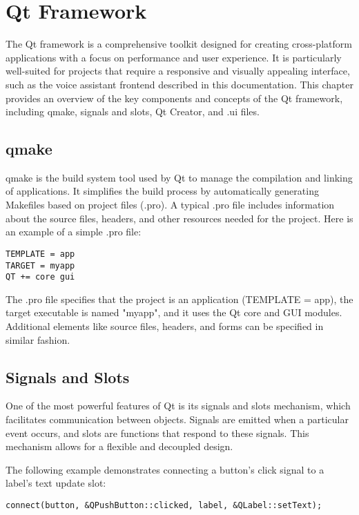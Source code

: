 \renewcommand*\chapterpagestyle{scrheadings}
\chapter{Qt Framework}

The Qt framework is a comprehensive toolkit designed for creating cross-platform applications
with a focus on performance and user experience. It is particularly well-suited for projects
that require a responsive and visually appealing interface, such as the voice assistant frontend
described in this documentation. This chapter provides an overview of the key components
and concepts of the Qt framework, including qmake, signals and slots, Qt Creator, and .ui files.

\section{qmake}
qmake is the build system tool used by Qt to manage the compilation and linking of applications.
It simplifies the build process by automatically generating Makefiles based on project files (.pro).
A typical .pro file includes information about the source files, headers, and other resources needed
for the project. Here is an example of a simple .pro file:

\begin{verbatim}
TEMPLATE = app
TARGET = myapp
QT += core gui
\end{verbatim}

The .pro file specifies that the project is an application (TEMPLATE = app), the target executable
is named "myapp", and it uses the Qt core and GUI modules. Additional elements like source files,
headers, and forms can be specified in similar fashion.

\section{Signals and Slots}
One of the most powerful features of Qt is its signals and slots mechanism, which facilitates
communication between objects. Signals are emitted when a particular event occurs, and slots
are functions that respond to these signals. This mechanism allows for a flexible and decoupled design.

The following example demonstrates connecting a button's click signal to a label's text update slot:

\begin{verbatim}
connect(button, &QPushButton::clicked, label, &QLabel::setText);
\end{verbatim}

